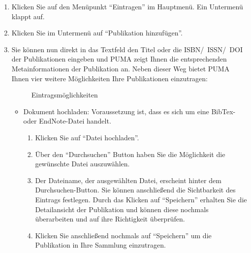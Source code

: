 \begin{enumerate}
    \item Klicken Sie auf den Menüpunkt \enquote{Eintragen} im Hauptmenü. Ein Untermenü klappt auf.
    \item Klicken Sie im Untermenü auf \enquote{Publikation hinzufügen}.
    \item Sie können nun direkt in das Textfeld den Titel oder die ISBN/~ISSN/~DOI der Publikationen eingeben und PUMA zeigt Ihnen die entsprechenden Metainformationen der Publikation an. Neben dieser Weg bietet PUMA Ihnen vier weitere Möglichkeiten Ihre Publikationen einzutragen:
\begin{figure}[h!]
 \centering
 \caption{Eintragsmöglichkeiten}
 \label{figure009}
\end{figure}  
    \begin{itemize}
    	\item Dokument hochladen:\newline
        Voraussetzung ist, dass es sich um eine BibTex- oder EndNote-Datei handelt.
        \begin{enumerate}
            \item Klicken Sie auf \enquote{Datei hochladen}.
            \item Über den \enquote{Durchsuchen} Button haben Sie die Möglichkeit die gewünschte Datei auszuwählen.
            \item Der Dateiname, der ausgewählten Datei, erscheint hinter dem Durchsuchen-Button. Sie können anschließend die Sichtbarkeit des Eintrags festlegen. Durch das Klicken auf \enquote{Speichern} erhalten Sie die Detailansicht der Publikation und können diese nochmals überarbeiten und auf ihre Richtigkeit überprüfen.
            \item Klicken Sie anschließend nochmals auf \enquote{Speichern} um die Publikation in Ihre Sammlung einzutragen.
        \end{enumerate}

\end{itemize}
\end{enumerate}
